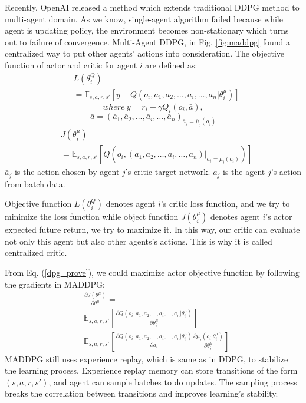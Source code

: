 \documentclass[11pt,twocolumn]{jarticle} %
\begin{document}
Recently, OpenAI released a method which extends traditional DDPG method to multi-agent domain\cite{maddpg}. As we know, single-agent algorithm failed because while agent is updating policy, the environment becomes non-stationary which turns out to failure of convergence. Multi-Agent DDPG, in Fig. \ref{fig:maddpg} found a centralized way to put other agents’ actions into consideration. The objective function of actor and critic for agent $i$ are defined as:
\begin{equation}
\begin{split}
& L(\theta^Q_i) \\
& = \mathbb{E}_{s,a,r,s'}[y - Q(o_i, a_1, a_2, \ldots, a_i ,\ldots, a_n|\theta^\mu_i)] 
\end{split}
\end{equation}
$$where\ y = r_i + \gamma{Q_i}(o_i, \bar{a}),$$
$$ \bar{a} = (\bar{a}_1, \bar{a}_2, \ldots, \bar{a}_i ,\ldots, \bar{a}_n)_{\bar{a}_j = \bar{\mu}_j(o_j)}$$
\begin{equation}
\begin{split}
& J(\theta^\mu_i) \\
& = \mathbb{E}_{s,a,r,s'}[Q(o_i, (a_1, a_2, \ldots, a_i ,\ldots, a_n) | _{a_i = \mu_i(o_i)})] 
\end{split}
\end{equation}
$\bar{a}_j$ is the action chosen by agent $j$'s critic target network. $a_j$ is the agent $j$'s action from batch data. \par
Objective function $L(\theta^Q_i)$ denotes agent $i$'s critic loss function, and we try to minimize the loss function while object function $J(\theta^\mu_i)$ denotes agent $i$'s actor expected future return, we try to maximize it. In this way, our critic can evaluate not only this agent but also other agents's actions. This is why it is called centralized critic. \par
From Eq. (\ref{dpg_prove}), we could maximize actor objective function by following the gradients in MADDPG:
\begin{equation}
\begin{split}
&\frac{\partial J(\theta^\mu)}{\partial \theta^\mu} = \\
& \mathbb{E}_{s,a,r,s'}[\frac{\partial Q(o_i, a_1, a_2, \ldots, a_i ,\ldots, a_n|\theta^\mu_i)}{\partial \theta^\mu_i}] \\
& \mathbb{E}_{s,a,r,s'}[\frac{\partial Q(o_i, a_1, a_2, \ldots, a_i ,\ldots, a_n|\theta^\mu_i)}{\partial a_i} \frac{\partial \mu_i(o_i|\theta^\mu_i)}{\partial \theta^\mu_i}]
\end{split}
\end{equation}
MADDPG still uses experience replay, which is same as in DDPG, to stabilize the learning process. Experience replay\cite{replay} memory can store transitions of the form $(s,a,r,s')$, and agent can sample batches to do updates. The sampling process breaks the correlation between transitions and improves learning's stability. \par
\end{document}
